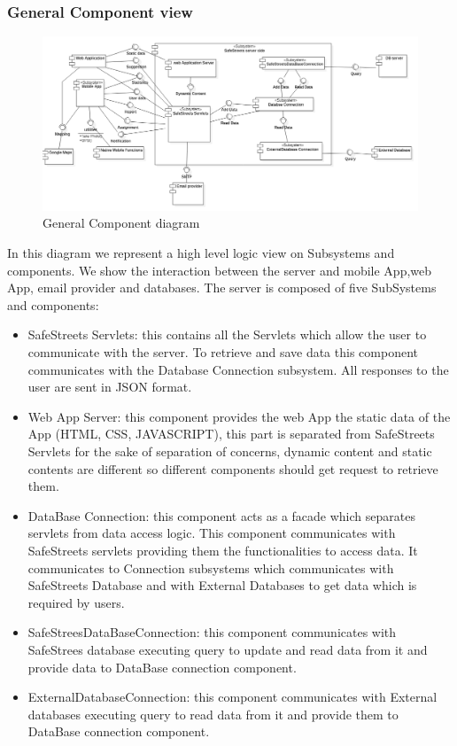 \subsubsection{General Component view}
\begin{figure}[H]
\centering
\includegraphics[width=\textwidth]{Images/GenericComponentDiagram.png}
\caption{\label{fig:ComWI}General Component diagram}
\end{figure}
In this diagram we represent a high level logic view on Subsystems and components. We show the interaction between the server and mobile App,web App, email provider and databases.
The server is composed of five SubSystems and components:
\begin{itemize}
\item  SafeStreets Servlets: this contains all the Servlets which allow the user to communicate with the server. To retrieve and save data this component communicates with the Database Connection subsystem. All responses to the user are sent in JSON format. 
\item Web App Server: this component provides the web App the static data of the App (HTML, CSS, JAVASCRIPT), this part is separated from SafeStreets Servlets for the sake of separation of concerns, dynamic content and static contents are different so different components should get request to retrieve them.
\item DataBase Connection: this component acts as a facade which separates servlets from data access logic. This component communicates with SafeStreets servlets providing them the functionalities to access data.
It communicates to Connection subsystems which communicates with SafeStreets Database and with External Databases to get data which is required by users.
\item SafeStreesDataBaseConnection: this component communicates with SafeStrees database executing query to update and read data from it and provide data to DataBase connection component. 
\item ExternalDatabaseConnection: this component communicates with External databases executing query to read data from it and provide them to DataBase connection component.
\end{itemize}
